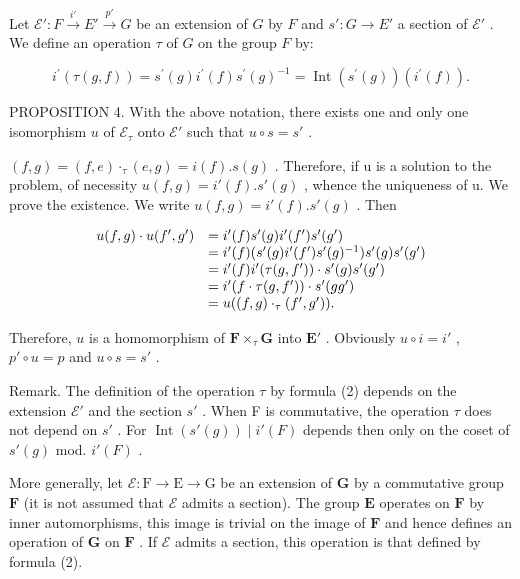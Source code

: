 Let \(\mathcal{E}'\colon F\stackrel{i'}{\to}E'\stackrel{p'}{\to}G\) be an extension of \(G\) by \(F\) and \(s'\colon G\to E'\) a section of \(\mathcal{E}'\) . We define an operation \(\tau\) of \(G\) on the group \(F\) by:

\[
i ^ {\prime} (\tau (g, f)) = s ^ {\prime} (g) i ^ {\prime} (f) s ^ {\prime} (g) ^ {- 1} = \operatorname{Int} (s ^ {\prime} (g)) (i ^ {\prime} (f)).\tag{2}
\]

PROPOSITION 4. With the above notation, there exists one and only one isomorphism \(u\) of \(\mathcal{E}_{\tau}\) onto \(\mathcal{E}'\) such that \(u \circ s = s'\) .

\((f, g) = (f, e) \cdot_ {\tau} (e, g) = i(f).s(g)\) . Therefore, if u is a solution to the problem, of necessity \(u(f,g)=i'(f).s'(g)\) , whence the uniqueness of u. We prove the existence. We write \(u(f,g)=i'(f).s'(g)\) . Then

\[
\begin{array}{r l} u (f, g) \cdot u (f ^ {\prime}, g ^ {\prime}) & = i ^ {\prime} (f) s ^ {\prime} (g) i ^ {\prime} (f ^ {\prime}) s ^ {\prime} (g ^ {\prime}) \\ & = i ^ {\prime} (f) (s ^ {\prime} (g) i ^ {\prime} (f ^ {\prime}) s ^ {\prime} (g) ^ {- 1}) s ^ {\prime} (g) s ^ {\prime} (g ^ {\prime}) \\ & = i ^ {\prime} (f) i ^ {\prime} (\tau (g, f ^ {\prime})) \cdot s ^ {\prime} (g) s ^ {\prime} (g ^ {\prime}) \\ & = i ^ {\prime} (f \cdot \tau (g, f ^ {\prime})) \cdot s ^ {\prime} (g g ^ {\prime}) \\ & = u ((f, g) \cdot_ {\tau} (f ^ {\prime}, g ^ {\prime})). \end{array}
\]

Therefore, \(u\) is a homomorphism of \(\mathbf{F} \times_{\tau} \mathbf{G}\) into \(\mathbf{E}'\) . Obviously \(u \circ i = i'\) , \(p' \circ u = p\) and \(u \circ s = s'\) .

Remark. The definition of the operation \(\tau\) by formula (2) depends on the extension \(\mathcal{E}'\) and the section \(s'\) . When F is commutative, the operation \(\tau\) does not depend on \(s'\) . For \(\operatorname{Int}(s'(g)) \mid i'(F)\) depends then only on the coset of \(s'(g)\) mod. \(i'(F)\) .

More generally, let \(\mathcal{E}:\mathrm{F}\to \mathrm{E}\to \mathrm{G}\) be an extension of \(\mathbf{G}\) by a commutative group \(\mathbf{F}\) (it is not assumed that \(\mathcal{E}\) admits a section). The group \(\mathbf{E}\) operates on \(\mathbf{F}\) by inner automorphisms, this image is trivial on the image of \(\mathbf{F}\) and hence defines an operation of \(\mathbf{G}\) on \(\mathbf{F}\) . If \(\mathcal{E}\) admits a section, this operation is that defined by formula (2).

